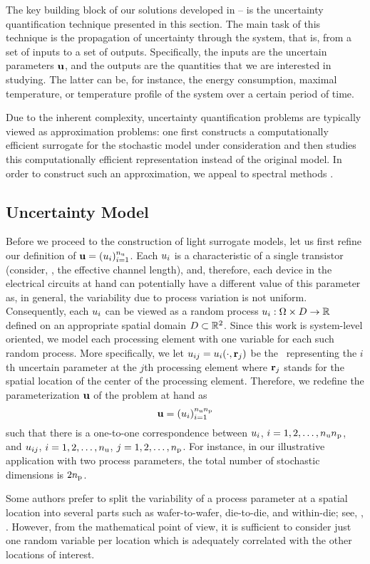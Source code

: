 The key building block of our solutions developed in -- is the uncertainty quantification technique presented in this section.
The main task of this technique is the propagation of uncertainty through the system, that is, from a set of inputs to a set of outputs.
Specifically, the inputs are the uncertain parameters $\mathbf{u}$, and the outputs are the quantities that we are interested in studying.
The latter can be, for instance, the energy consumption, maximal temperature, or temperature profile of the system over a certain period of time.

Due to the inherent complexity, uncertainty quantification problems are typically viewed as approximation problems: one first constructs a computationally efficient surrogate for the stochastic model under consideration and then studies this computationally efficient representation instead of the original model.
In order to construct such an approximation, we appeal to spectral methods \cite{maitre2010, janson1997, eldred2008}.

\subsection{Uncertainty Model}
Before we proceed to the construction of light surrogate models, let us first refine our definition of $\mathbf{u} = (u_i)_{i = 1}^{n_\text{u}}$.
Each $u_i$ is a characteristic of a single transistor (consider, \eg, the effective channel length), and, therefore, each device in the electrical circuits at hand can potentially have a different value of this parameter as, in general, the variability due to process variation is not uniform.
Consequently, each $u_i$ can be viewed as a random process $u_i: \Omega \times D \to \mathbb{R}$ defined on an appropriate spatial domain $D \subset \mathbb{R}^2$.
Since this work is system-level oriented, we model each processing element with one variable for each such random process.
More specifically, we let $u_{ij} = u_i(\cdot, \mathbf{r}_j)$ be the \rv\ representing the $i$th uncertain parameter at the $j$th processing element where $\mathbf{r}_j$ stands for the spatial location of the center of the processing element.
Therefore, we redefine the parameterization $\mathbf{u}$ of the problem at hand as
\begin{equation} \elab{uncertain-parameters}
  \vu = (\u_i)_{i = 1}^{\nparams \nprocs}
\end{equation}
such that there is a one-to-one correspondence between $u_i$, $i = 1, 2, \dots, {n_\text{u}} {n_\text{p}}$, and $u_{ij}$, $i = 1, 2, \dots, {n_\text{u}}$, $j = 1, 2, \dots, {n_\text{p}}$.
For instance, in our illustrative application with two process parameters, the total number of stochastic dimensions is $2 {n_\text{p}}$.
\begin{remark}
Some authors prefer to split the variability of a process parameter at a spatial location into several parts such as wafer-to-wafer, die-to-die, and within-die; see, \eg, \cite{juan2012}.
However, from the mathematical point of view, it is sufficient to consider just one random variable per location which is adequately correlated with the other locations of interest.
\end{remark}

